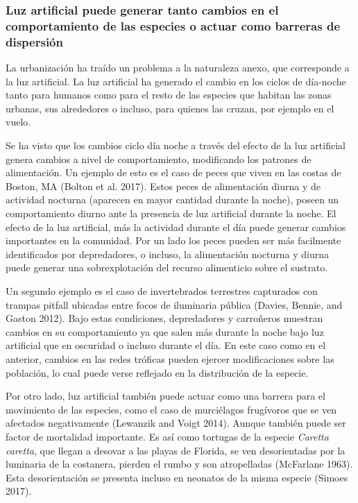 \documentclass[]{article}
\begin{document}
\subsubsection{Luz artificial puede generar tanto cambios en el
comportamiento de las especies o actuar como barreras de
dispersión}\label{luz-artificial-puede-generar-tanto-cambios-en-el-comportamiento-de-las-especies-o-actuar-como-barreras-de-dispersion}

La urbanización ha traído un problema a la naturaleza anexo, que
corresponde a la luz artificial. La luz artificial ha generado el cambio
en los ciclos de día-noche tanto para humanos como para el resto de las
especies que habitan las zonas urbanas, sus alrededores o incluso, para
quienes las cruzan, por ejemplo en el vuelo.

Se ha visto que los cambios ciclo día noche a través del efecto de la
luz artificial genera cambios a nivel de comportamiento, modificando los
patrones de alimentación. Un ejemplo de esto es el caso de peces que
viven en las costas de Boston, MA (Bolton et al. 2017). Estos peces de
alimentación diurna y de actividad nocturna (aparecen en mayor cantidad
durante la noche), poseen un comportamiento diurno ante la presencia de
luz artificial durante la noche. El efecto de la luz artificial, más la
actividad durante el día puede generar cambios importantes en la
comunidad. Por un lado los peces pueden ser más facilmente identificados
por depredadores, o incluso, la alimentación nocturna y diurna puede
generar una sobrexplotación del recurso alimenticio sobre el sustrato.

Un segundo ejemplo es el caso de invertebrados terrestres capturados con
trampas pitfall ubicadas entre focos de iluminaria pública (Davies,
Bennie, and Gaston 2012). Bajo estas condiciones, depredadores y
carroñeros muestran cambios en su comportamiento ya que salen más
durante la noche bajo luz artificial que en oscuridad o incluso durante
el día. En este caso como en el anterior, cambios en las redes tróficas
pueden ejercer modificaciones sobre las población, lo cual puede verse
reflejado en la distribución de la especie.

Por otro lado, luz artificial también puede actuar como una barrera para
el movimiento de las especies, como el caso de murciélagos frugívoros
que se ven afectados negativamente (Lewanzik and Voigt 2014). Aunque
también puede ser factor de mortalidad importante. Es así como tortugas
de la especie \emph{Caretta caretta}, que llegan a desovar a las playas
de Florida, se ven desorientadas por la luminaria de la costanera,
pierden el rumbo y son atropelladas (McFarlane 1963). Esta
desorientación se presenta incluso en neonatos de la misma especie
(Simoes 2017).
\end{document}
